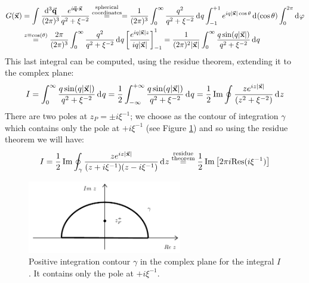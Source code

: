 \documentclass[../../Main/Main.tex]{subfiles}
\begin{document}
\begin{equation*}
\begin{split}
G(\va{x}) & =   \int_{}^{}  \frac{ \dd[3]{\va{q}}}{(2 \pi )^3} \frac{e^{i \va{q} \vdot \va{x}}}{q^2 + \xi ^{-2}}  \overset{\substack{ \text{spherical} \\ \text{coordinates}} }{=}
= \frac{1}{ (2 \pi )^3} \int_{0}^{\infty }  \frac{q^2}{q^2+ \xi ^{-2}} \dd[]{q} \int_{-1}^{+1}    e^{i q \abs{\va{x}} \cos \theta  } \dd[]{(\cos \theta  )} \int_{0}^{2 \pi } \dd[]{ \varphi}
\\
 &\overset{z \equiv \cos(\theta ) }{=}  \frac{2 \pi }{(2 \pi )^3} \int_{0}^{\infty }  \frac{q^2}{q^2 + \xi ^{-2}} \dd[]{q} \qty[\frac{  e^{i q \abs{\va{x}} z } }{i q \abs{\va{x}} } ]_{-1}^{1}
 = \frac{1}{(2 \pi )^2 \abs{\va{x}} } \int_{0}^{\infty } \frac{q \sin(q \abs{\va{x}} ) }{q^2 + \xi ^{-2}} \dd[]{q}
\end{split}
\end{equation*}
This last integral can be computed, using the residue theorem, extending it to the complex plane:
\begin{equation*}
  I = \int_{0}^{\infty } \frac{q \sin(q \abs{\va{x}} ) }{q^2 + \xi ^{-2}} \dd[]{q}
  = \frac{1}{2} \int_{- \infty }^{+ \infty } \frac{q \sin(q \abs{\va{x}} ) }{q^2 + \xi ^{-2}} \dd[]{q}
  = \frac{1}{2} \Im \oint \frac{z e^{i z \abs{\va{x}} } }{\qty(z^2 + \xi ^{-2}) } \dd[]{z}
\end{equation*}
There are two poles at \( z_P = \pm i \xi ^{-1} \); we choose as the contour of integration \( \gamma   \) which contains only the pole at \( +i \xi ^{-1} \) (see Figure \ref{fig:18_1}) and so using the residue theorem we will have:
\begin{equation*}
I  =
\frac{1}{2}  \Im \oint_\gamma \frac{z e^{i z \abs{\va{x}} } }{ \qty(z + i \xi ^{-1}) \qty(z - i \xi ^{-1})  } \dd[]{z}
 \overset{\substack{ \text{residue} \\  \text{theorem} } }{=}  \frac{1}{2} \Im \qty[2 \pi  i \text{Res} (i \xi ^{-1})]
\end{equation*}
\begin{figure}[H]
\centering
\includegraphics[width=0.6\textwidth]{./img/1__1.pdf}
\caption{\label{fig:18_1} Positive integration contour \( \gamma   \) in the complex plane for the integral \( I \). It contains only the pole at \( +i \xi ^{-1} \).}
\end{figure}
\end{document}
